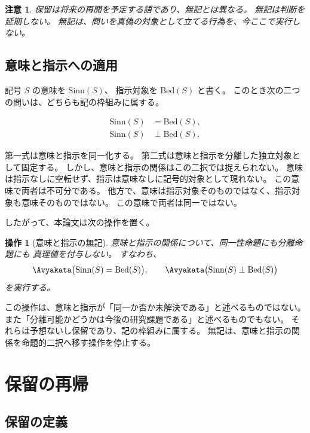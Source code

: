 \documentclass[11pt,a4paper,ja=standard,lualatex]{article}
\newtheorem{remark}{注意}
\newtheorem{operation}{操作}
\begin{document}
\begin{remark}
保留は将来の再開を予定する語であり、無記とは異なる。
無記は判断を延期しない。
無記は、問いを真偽の対象として立てる行為を、今ここで実行しない。
\end{remark}

\subsection{意味と指示への適用}

記号 $S$ の意味を $\mathrm{Sinn}(S)$、
指示対象を $\mathrm{Bed}(S)$ と書く。
このとき次の二つの問いは、どちらも記の枠組みに属する。

\begin{align}
\mathrm{Sinn}(S) &= \mathrm{Bed}(S),\\
\mathrm{Sinn}(S) &\perp \mathrm{Bed}(S).
\end{align}

第一式は意味と指示を同一化する。
第二式は意味と指示を分離した独立対象として固定する。
しかし、意味と指示の関係はこの二択では捉えられない。
意味は指示なしに空転せず、指示は意味なしに記号的対象として現れない。
この意味で両者は不可分である。
他方で、意味は指示対象そのものではなく、指示対象も意味そのものではない。
この意味で両者は同一ではない。

したがって、本論文は次の操作を置く。

\begin{operation}[意味と指示の無記]
意味と指示の関係について、同一性命題にも分離命題にも
真理値を付与しない。
すなわち、
\begin{equation}
\Avyakata\bigl(\mathrm{Sinn}(S)=\mathrm{Bed}(S)\bigr),
\qquad
\Avyakata\bigl(\mathrm{Sinn}(S)\perp\mathrm{Bed}(S)\bigr)
\end{equation}
を実行する。
\end{operation}

この操作は、意味と指示が「同一か否か未解決である」と述べるものではない。
また「分離可能かどうかは今後の研究課題である」と述べるものでもない。
それらは予想ないし保留であり、記の枠組みに属する。
無記は、意味と指示の関係を命題的二択へ移す操作を停止する。

\section{保留の再帰}

\subsection{保留の定義}
\end{document}

